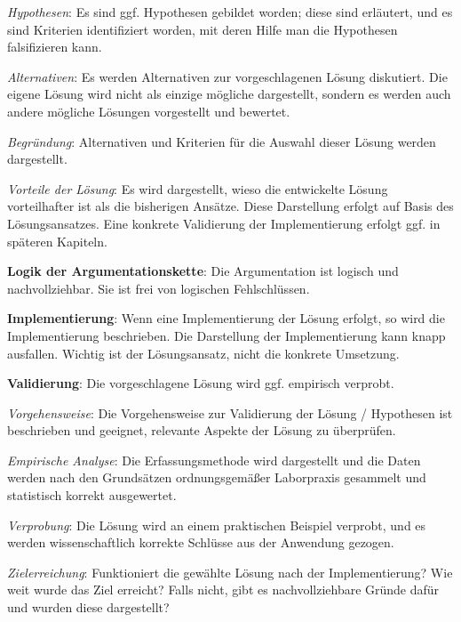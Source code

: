 \begin{checklist}
\begin{checklist}
        \item \textit{Hypothesen}: Es sind ggf. Hypothesen gebildet worden; diese sind erläutert, und es sind Kriterien identifiziert worden, mit deren Hilfe man die Hypothesen falsifizieren kann.
        \item \textit{Alternativen}: Es werden Alternativen zur vorgeschlagenen Lösung diskutiert. Die eigene Lösung wird nicht als einzige mögliche dargestellt, sondern es werden auch andere mögliche Lösungen vorgestellt und bewertet.
        \item \textit{Begründung}: Alternativen und Kriterien für die Auswahl dieser Lösung werden dargestellt.
        \item \textit{Vorteile der Lösung}: Es wird dargestellt, wieso die entwickelte Lösung vorteilhafter ist als die bisherigen Ansätze. Diese Darstellung erfolgt auf Basis des Lösungsansatzes. Eine konkrete Validierung der Implementierung erfolgt ggf. in späteren Kapiteln.
    \end{checklist}
  \item \textbf{Logik der Argumentationskette}: Die Argumentation ist logisch und nachvollziehbar. Sie ist frei von logischen Fehlschlüssen.
  \item \textbf{Implementierung}: Wenn eine Implementierung der Lösung erfolgt, so wird die Implementierung beschrieben. Die Darstellung der Implementierung kann knapp ausfallen. Wichtig ist der Lösungsansatz, nicht die konkrete Umsetzung.
  \item \textbf{Validierung}: Die vorgeschlagene Lösung wird ggf. empirisch verprobt.
    \begin{checklist}
        \item \textit{Vorgehensweise}: Die Vorgehensweise zur Validierung der Lösung / Hypothesen ist beschrieben und geeignet, relevante Aspekte der Lösung zu überprüfen.
        \item \textit{Empirische Analyse}: Die Erfassungsmethode wird dargestellt und die Daten werden nach den Grundsätzen ordnungsgemäßer Laborpraxis gesammelt und statistisch korrekt ausgewertet.
        \item \textit{Verprobung}: Die Lösung wird an einem praktischen Beispiel verprobt, und es werden wissenschaftlich korrekte Schlüsse aus der Anwendung gezogen.
        \item \textit{Zielerreichung}: Funktioniert die gewählte Lösung nach der Implementierung? Wie weit wurde das Ziel erreicht? Falls nicht, gibt es nachvollziehbare Gründe dafür und wurden diese dargestellt?

\end{checklist}
\end{checklist}
